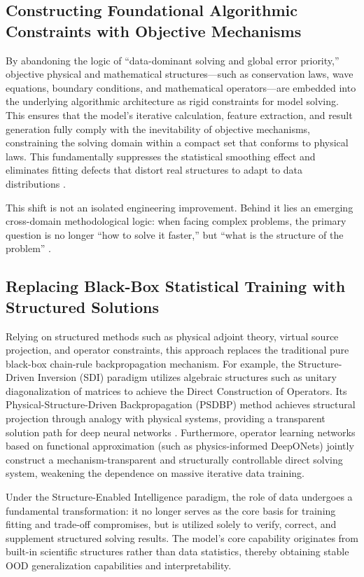 \documentclass[11pt,a4paper]{article}
\begin{document}
\subsection{Constructing Foundational Algorithmic Constraints with Objective Mechanisms}
By abandoning the logic of ``data-dominant solving and global error priority,'' objective physical and mathematical structures---such as conservation laws, wave equations, boundary conditions, and mathematical operators---are embedded into the underlying algorithmic architecture as rigid constraints for model solving. This ensures that the model's iterative calculation, feature extraction, and result generation fully comply with the inevitability of objective mechanisms, constraining the solving domain within a compact set that conforms to physical laws. This fundamentally suppresses the statistical smoothing effect and eliminates fitting defects that distort real structures to adapt to data distributions \cite{tikhonov1977,engl1996}.

This shift is not an isolated engineering improvement. Behind it lies an emerging cross-domain methodological logic: when facing complex problems, the primary question is no longer ``how to solve it faster,'' but ``what is the structure of the problem'' \cite{chen2026sd}.

\subsection{Replacing Black-Box Statistical Training with Structured Solutions}
Relying on structured methods such as physical adjoint theory, virtual source projection, and operator constraints, this approach replaces the traditional pure black-box chain-rule backpropagation mechanism. For example, the Structure-Driven Inversion (SDI) paradigm utilizes algebraic structures such as unitary diagonalization of matrices to achieve the Direct Construction of Operators. Its Physical-Structure-Driven Backpropagation (PSDBP) method achieves structural projection through analogy with physical systems, providing a transparent solution path for deep neural networks \cite{chen2026sdi}. Furthermore, operator learning networks based on functional approximation (such as physics-informed DeepONets) \cite{lu2021} jointly construct a mechanism-transparent and structurally controllable direct solving system, weakening the dependence on massive iterative data training.

Under the Structure-Enabled Intelligence paradigm, the role of data undergoes a fundamental transformation: it no longer serves as the core basis for training fitting and trade-off compromises, but is utilized solely to verify, correct, and supplement structured solving results. The model's core capability originates from built-in scientific structures rather than data statistics, thereby obtaining stable OOD generalization capabilities and interpretability.
\end{document}
